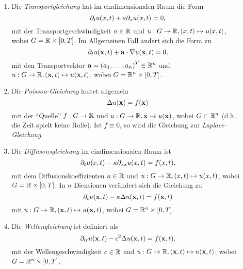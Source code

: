 \documentclass{lecture}
\begin{document}
    \begin{example}
        \begin{enumerate}
            \item Die \emph{Transportgleichung} hat im eindimensionalen Raum die Form
            \[
                \partial_t u\parentheses*{x, t} + a\partial_x u\parentheses*{x, t} = 0,
            \]
            mit der Transportgeschwindigkeit \(a \in \R\) und \(u: G \to \R, \parentheses*{x, t} \mapsto u\parentheses*{x, t}\), wobei \(G = \R \times \brackets*{0, T}\).
            Im Allgemeinen Fall ändert sich die Form zu
            \[
                \partial_t u\parentheses*{\mathbf{x}, t} + \mathbf{a} \cdot \nabla u\parentheses*{\mathbf{x}, t} = 0,
            \]
            mit den Transportvektor \(\mathbf{a} = \parentheses*{a_1, \ldots, a_n}^T \in \R^n\) und \(u: G \to \R, \parentheses*{\mathbf{x}, t} \mapsto u\parentheses*{\mathbf{x}, t}\), wobei \(G = \R^n \times \brackets*{0, T}\).
            \item Die \emph{Poisson-Gleichung} lautet allgemein
            \[
                \Delta u\parentheses*{\mathbf{x}} = f\parentheses*{\mathbf{x}}
            \]
            mit der ``Quelle'' \(f: G \to \R\) und \(u: G \to \R, \mathbf{x} \mapsto u\parentheses*{\mathbf{x}}\), wobei \(G \subset \R^n\) (d.h. die Zeit spielt keine Rolle).
            Ist \(f \equiv 0\), so wird die Gleichung zur \emph{Laplace-Gleichung}.
            \item Die \emph{Diffusonsgleichung} im eindimensionalen Raum ist
            \[
                \partial_t u\parentheses*{x, t} - \kappa\partial_{xx}u\parentheses*{x, t} = f\parentheses*{x, t},
            \]
            mit dem Diffusionskoeffizienten \(\kappa \in \R\) und \(u: G \to \R, \parentheses*{x, t} \mapsto u\parentheses*{x, t}\), wobei \(G = \R \times \brackets*{0, T}\).
            In \(n\) Diensionen verändert sich die Gleichung zu
            \[
                \partial_t u\parentheses*{\mathbf{x}, t} - \kappa\Delta u\parentheses*{\mathbf{x}, t} = f\parentheses*{\mathbf{x}, t}
            \]
            mit \(u: G \to \R, \parentheses*{\mathbf{x}, t} \mapsto u\parentheses*{\mathbf{x}, t}\), wobei \(G = \R^n \times \brackets*{0, T}\).
            \item Die \emph{Wellengleichung} ist definiert als
            \[\partial_{tt}u\parentheses*{\mathbf{x}, t} - c^2 \Delta u\parentheses*{\mathbf{x}, t} = f\parentheses*{\mathbf{x}, t},\]
            mit der Wellengeschwindigkeit \(c \in \R\) und \(u: G \to \R, \parentheses*{\mathbf{x}, t} \mapsto u\parentheses*{\mathbf{x}, t}\), wobei \(G = \R^n \times \brackets*{0, T}\).

\end{enumerate}
\end{example}
\end{document}
